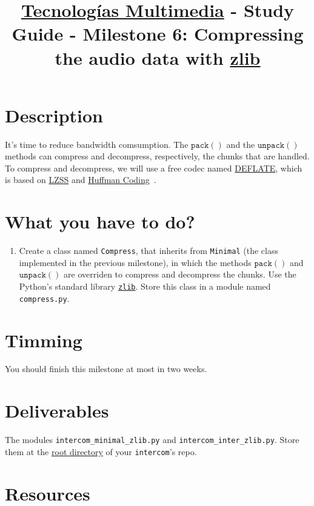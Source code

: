 \title{\href{https://www.ual.es/estudios/grados/presentacion/plandeestudios/asignatura/4015/40154321?idioma=zh_CN}{Tecnologías Multimedia} - Study Guide - Milestone 6: Compressing the audio data with \href{https://zlib.net/}{zlib}}

\maketitle

\section{Description}

It's time to reduce bandwidth comsumption. The $\mathtt{pack()}$ and
the $\mathtt{unpack()}$ methods can compress and decompress,
respectively, the chunks that are handled. To compress and decompress,
we will use a free codec named
\href{https://en.wikipedia.org/wiki/DEFLATE}{DEFLATE}, which is based
on \href{https://en.wikipedia.org/wiki/Lempel%E2%80%93Ziv%E2%80%93Storer%E2%80%93Szymanski}{LZSS}
and \href{https://en.wikipedia.org/wiki/Huffman_coding}{Huffman Coding}~\cite{nelson96datacompression}.

\section{What you have to do?}

\begin{enumerate}
\item Create a class named \texttt{Compress}, that inherits from
  \texttt{Minimal} (the class implemented in the previous milestone),
  in which the methods $\mathtt{pack()}$ and $\mathtt{unpack()}$ are
  overriden to compress and decompress the chunks. Use the Python's
  standard library
  \href{https://docs.python.org/3/library/zlib.html}{\texttt{zlib}}. Store
  this class in a module named \texttt{compress.py}.
\end{enumerate}

\section{Timming}

You should finish this milestone at most in two weeks.

\section{Deliverables}

The modules \texttt{intercom\_minimal\_zlib.py} and
\texttt{intercom\_inter\_zlib.py}. Store them at the
\href{https://github.com/Tecnologias-multimedia/intercom}{root
  directory} of your \texttt{intercom}'s repo.

\section{Resources}


